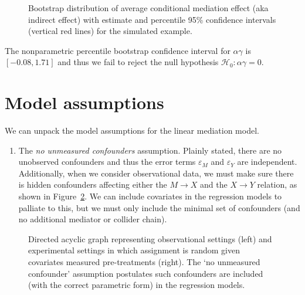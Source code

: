 \documentclass[
  11pt,
  letterpaper,
]{scrbook}
\providecommand{\tightlist}{%
  \setlength{\itemsep}{0pt}\setlength{\parskip}{0pt}}\usepackage{longtable,booktabs,array}
\theoremstyle{definition}
\theoremstyle{definition}
\theoremstyle{remark}
\begin{document}
\begin{figure}[ht!]


\caption{\label{fig-bootstrap}Bootstrap distribution of average
conditional mediation effect (aka indirect effect) with estimate and
percentile 95\% confidence intervals (vertical red lines) for the
simulated example.}

\end{figure}%

The nonparametric percentile bootstrap confidence interval for
\(\alpha\gamma\) is \([-0.08, 1.71]\) and thus we fail to reject the
null hypothesis \(\mathscr{H}_0: \alpha \gamma=0\).

\section{Model assumptions}\label{model-assumptions-2}

We can unpack the model assumptions for the linear mediation model.

\begin{enumerate}
\def\labelenumi{\arabic{enumi}.}
\tightlist
\item
  The \emph{no unmeasured confounders} assumption. Plainly stated, there
  are no unobserved confounders and thus the error terms
  \(\varepsilon_M\) and \(\varepsilon_Y\) are independent. Additionally,
  when we consider observational data, we must make sure there is hidden
  confounders affecting either the \(M \to X\) and the \(X \to Y\)
  relation, as shown in Figure~\ref{fig-dag1}. We can include covariates
  in the regression models to palliate to this, but we must only include
  the minimal set of confounders (and no additional mediator or collider
  chain).
\end{enumerate}

\begin{figure}[ht!]


\caption{\label{fig-dag1}Directed acyclic graph representing
observational settings (left) and experimental settings in which
assignment is random given covariates measured pre-treatments (right).
The `no unmeasured confounder' assumption postulates such confounders
are included (with the correct parametric form) in the regression
models.}

\end{figure}%
\end{document}
